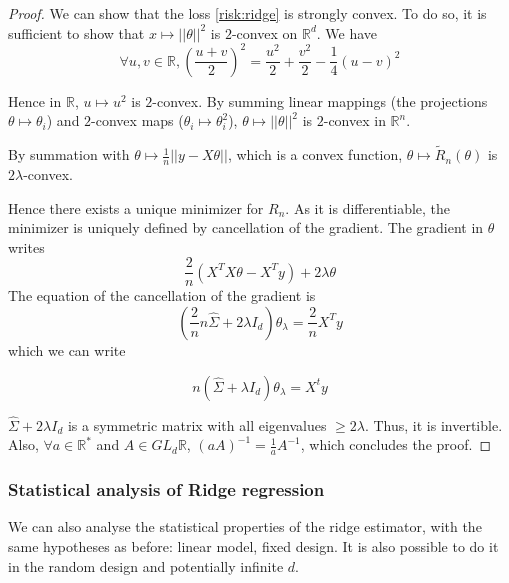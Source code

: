 \documentclass[
10pt, %
a4paper, %
oneside, %
headinclude,footinclude, %
BCOR5mm, %
]{scrartcl}
\begin{document}
\begin{proof}
We can show that the loss \ref{risk:ridge} is strongly convex. To do so, it is sufficient to show that $x\mapsto ||\theta||^2$ is $2$-convex on $ \mathbb{R}^d$. We have
\begin{equation*}
    \forall u, v\in \mathbb{R}, ( \frac{u+v}{2} )^2= \frac{u^2}{2} + \frac{v^2}{2} - \frac{1}{4} (u-v)^2
\end{equation*}

    Hence in $\mathbb{R} $, $ u\mapsto u^2$ is $2$-convex. By summing linear mappings (the projections $\theta\mapsto \theta_i$) and $2$-convex maps ($\theta_i\mapsto \theta_i^2$), $\theta\mapsto ||\theta||^2$ is $2$-convex in $ \mathbb{R}^n$.

    By summation with $ \theta \mapsto \frac{1}{n} ||y-X\theta||$, which is a convex function,  $\theta \mapsto \tilde{R}_n(\theta)$ is $2\lambda$-convex.

    Hence there exists a unique minimizer for $R_n$. As it is differentiable, the minimizer is uniquely defined by cancellation of the gradient. The gradient in $\theta$ writes
    \begin{equation*}
	\frac{2}{n} (X^TX\theta - X^Ty)+2\lambda \theta
    \end{equation*}
    The equation of the cancellation of the gradient is
    \begin{equation*}
	(\frac{2}{n} n \hat{\Sigma} + 2\lambda I_d)\theta_{\lambda} = \frac{2}{n} X^Ty
    \end{equation*}
    which we can write

    \begin{equation*}
	n(\hat{\Sigma}+\lambda I_d)\theta_{\lambda} = X^ty
    \end{equation*}

    $ \hat{\Sigma}+2\lambda I_d$ is a symmetric matrix with all eigenvalues $\geq 2\lambda$. Thus, it is invertible. Also, $\forall a\in \mathbb{R}^* $ and $ A\in GL_d\mathbb{R} $, $(aA)^{-1} = \frac{1}{a} A^{-1}$, which concludes the proof.
\end{proof}
    
\subsubsection{\large\color{Periwinkle}Statistical analysis of Ridge regression}

We can also analyse the statistical properties of the ridge estimator, with the same hypotheses as before: linear model, fixed design. It is also possible to do it in the random design and potentially infinite $d$.
\end{document}
